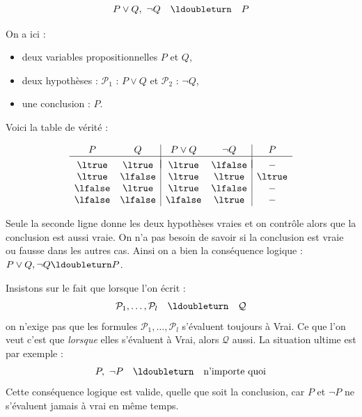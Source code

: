 \documentclass[11pt,class=report,crop=false]{standalone}
\begin{document}
\begin{exemple}
	\[
	P \lor Q , \ \lnot Q \quad \ldoubleturn \quad P
	\]

On a ici :
\begin{itemize}
	\item deux variables propositionnelles $P$ et $Q$,
	
	\item deux hypothèses : $\mathcal{P}_1$ : \og{}$P\lor Q$\fg{} et $\mathcal{P}_2$ : \og{}$\lnot Q$\fg{}, 
	
	\item une conclusion : \og{}$P$\fg{}.
\end{itemize}

Voici la table de vérité :

\[
\begin{array}{c c | c c | c}
	P		& Q 		& P \lor Q 		& \lnot Q 	&  P \\
	\hline
	&&&&	\\[-2ex]
	\ltrue 	& \ltrue 	& \ltrue		& \lfalse 	& - \\
	\ltrue 	& \lfalse 	& \ltrue		& \ltrue	& \ltrue \\
	\lfalse & \ltrue 	& \ltrue		& \lfalse	& - \\	
	\lfalse & \lfalse 	& \lfalse 		& \ltrue	& - \\		
\end{array}
\]

Seule la seconde ligne donne les deux hypothèses vraies et on contrôle alors que la conclusion est aussi vraie.
On n'a pas besoin de savoir si la conclusion est vraie ou fausse dans les autres cas.
Ainsi on a bien la conséquence logique : $P \lor Q ,  \lnot Q \ldoubleturn P$.
\end{exemple}


Insistons sur le fait que lorsque l'on écrit :
\[
	\mathcal{P}_1, \ldots, \mathcal{P}_l \quad \ldoubleturn \quad  \mathcal{Q}
\]
on n'exige pas que les formules $\mathcal{P}_1, \ldots, \mathcal{P}_l$ s'évaluent toujours à Vrai.
Ce que l'on veut c'est que \emph{lorsque} elles s'évaluent à Vrai, alors $\mathcal{Q}$ aussi.
La situation ultime est par exemple :
\[
P, \ \lnot P \quad \ldoubleturn \quad \text{n'importe quoi}
\]
Cette conséquence logique est valide, quelle que soit la conclusion, car $P$ et $\lnot P$ ne s'évaluent jamais à vrai en même temps.
\end{document}
